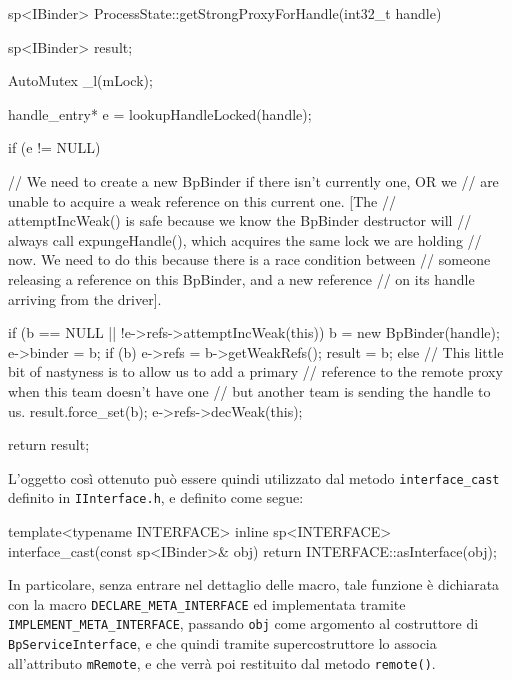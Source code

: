 \begin{cpp}[caption=$ $(2) ProcessState.cpp ]
sp<IBinder> ProcessState::getStrongProxyForHandle(int32_t handle)
{
    sp<IBinder> result;

    AutoMutex _l(mLock);

    handle_entry* e = lookupHandleLocked(handle);

    if (e != NULL) {
        // We need to create a new BpBinder if there isn't currently one, OR we
        // are unable to acquire a weak reference on this current one. [The
        // attemptIncWeak() is safe because we know the BpBinder destructor will 
        // always call expungeHandle(), which acquires the same lock we are holding 
        // now. We need to do this because there is a race condition between 
        // someone releasing a reference on this BpBinder, and a new reference 
        // on its handle arriving from the driver].

        if (b == NULL || !e->refs->attemptIncWeak(this)) {
            b = new BpBinder(handle); 
            e->binder = b;
            if (b) e->refs = b->getWeakRefs();
            result = b;
        } else {
            // This little bit of nastyness is to allow us to add a primary
            // reference to the remote proxy when this team doesn't have one
            // but another team is sending the handle to us.
            result.force_set(b);
            e->refs->decWeak(this);
        }
    }

    return result;
}
\end{cpp}
L'oggetto così ottenuto può essere quindi utilizzato dal metodo \texttt{\small interface\_cast}
definito in \texttt{\small IInterface.h}, e definito come segue:
\begin{cpp}
template<typename INTERFACE>
inline sp<INTERFACE> interface_cast(const sp<IBinder>& obj)
{
    return INTERFACE::asInterface(obj);
}
\end{cpp}
In particolare, senza entrare nel dettaglio delle macro, tale funzione è 
dichiarata con la macro \texttt{\small DECLARE\_META\_INTERFACE} ed implementata
tramite \texttt{\small IMPLEMENT\_META\_INTERFACE}, passando \texttt{\small obj} come
argomento al costruttore di \texttt{\small BpServiceInterface}, e che quindi tramite
supercostruttore lo associa all'attributo \texttt{\small mRemote}, e che verrà poi restituito dal
metodo \texttt{\small remote()}. 

